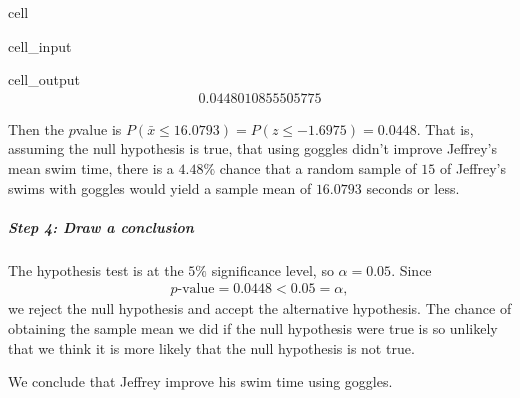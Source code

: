 \documentclass[letterpaper,10pt,english]{jupyterBook}
\begin{document}
\begin{sphinxuseclass}{cell}\begin{sphinxVerbatimInput}

\begin{sphinxuseclass}{cell_input}
\begin{sphinxVerbatim}[commandchars=\\\{\}]
\end{sphinxVerbatim}

\end{sphinxuseclass}\end{sphinxVerbatimInput}
\begin{sphinxVerbatimOutput}

\begin{sphinxuseclass}{cell_output}\begin{equation*}
\begin{split}0.0448010855505775\end{split}
\end{equation*}
\end{sphinxuseclass}\end{sphinxVerbatimOutput}

\end{sphinxuseclass}
\sphinxAtStartPar
Then the \(p\)\sphinxhyphen{}value is \(P(\bar{x} \leq 16.0793) = P(z \leq -1.6975) = 0.0448\). That is, assuming the null hypothesis is true, that using goggles didn’t improve Jeffrey’s mean swim time, there is a \(4.48\%\) chance that a random sample of \(15\) of Jeffrey’s swims with goggles would yield a sample mean of \(16.0793\) seconds or less.


\subparagraph{Step 4: Draw a conclusion}
\label{\detokenize{Ch6 An Introduction to Hypothesis Testing/6.4 Hypothesis Tests of One Population:step-4-draw-a-conclusion}}
\sphinxAtStartPar
The hypothesis test is at the \(5\%\) significance level, so \(\alpha = 0.05\). Since
\begin{equation*}
\begin{split}p\text{-value} = 0.0448 < 0.05 = \alpha, \end{split}
\end{equation*}
\sphinxAtStartPar
we reject the null hypothesis and accept the alternative hypothesis. The chance of obtaining the sample mean we did if the null hypothesis were true is so unlikely that we think it is more likely that the null hypothesis is not true.

\sphinxAtStartPar
We conclude that Jeffrey  improve his swim time using goggles.
\end{document}
